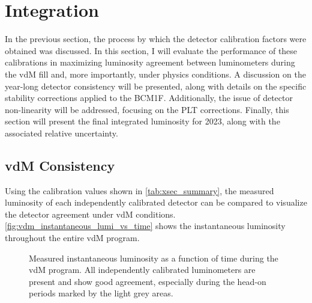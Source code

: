 \newpage

\section{Integration}

In the previous section, the process by which the detector calibration factors were obtained was discussed. In this section, I will evaluate the performance of these calibrations in maximizing luminosity agreement between luminometers during the vdM fill and, more importantly, under physics conditions. A discussion on the year-long detector consistency will be presented, along with details on the specific stability corrections applied to the BCM1F. Additionally, the issue of detector non-linearity will be addressed, focusing on the PLT corrections. Finally, this section will present the final integrated luminosity for 2023, along with the associated relative uncertainty.

\newpage

\subsection{vdM Consistency}
\label{subsec:vdm_consistency}

Using the calibration values shown in \autoref{tab:xsec_summary}, the measured luminosity of each independently calibrated detector can be compared to visualize the detector agreement under vdM conditions. \autoref{fig:vdm_instantaneous_lumi_vs_time} shows the instantaneous luminosity throughout the entire vdM program.

\begin{figure}[!htb]
	\centering
	\caption[Instantaneous luminosity during vdM]{Measured instantaneous luminosity as a function of time during the vdM program. All independently calibrated luminometers are present and show good agreement, especially during the head-on periods marked by the light grey areas.}
	\label{fig:vdm_instantaneous_lumi_vs_time}
\end{figure}

